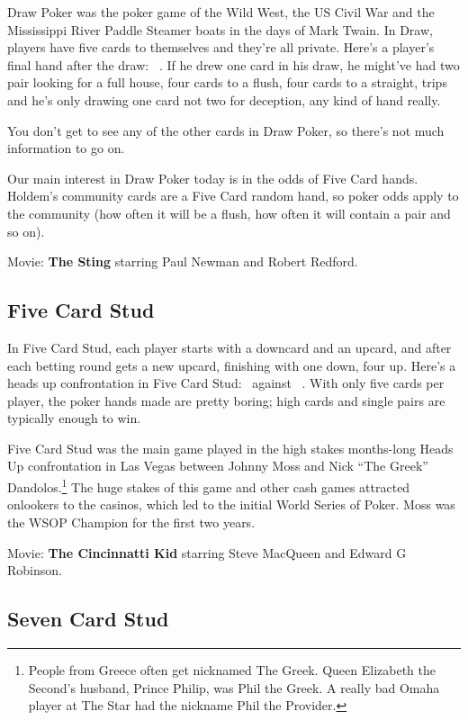Draw Poker was the poker game of the Wild West, the US Civil War and
the Mississippi River Paddle Steamer boats in the days of Mark Twain.
In Draw, players have five cards to themselves and they're
all private. Here's a player's final hand after the draw:
\back\back\back\back\back\ . If he drew one card in his draw,
he might've had two pair looking for a full house, four cards to a
flush, four cards to a straight, trips and he's only drawing one card
not two for deception, any kind of hand really.

You don't get to see any of the other cards in Draw Poker, so there's
not much information to go on.

Our main interest in Draw Poker today is in the odds of Five Card
hands. Holdem's community cards are a Five Card random hand, so poker
odds apply to the community (how often it will be a flush, how often
it will contain a pair and so on).

Movie: \textbf{The Sting} starring Paul Newman and Robert Redford.

\subsection{Five Card Stud}

In Five Card Stud, each player starts with a downcard and an upcard,
and after each betting round gets a new upcard, finishing with one
down, four up. Here's a heads up confrontation in Five Card Stud:
\back\nines\Qc\Jc\tred\ against \back\fourh\Jh\tend\trec\ . With
only five cards per player, the poker hands made are pretty boring;
high cards and single pairs are typically enough to win.

Five Card Stud was the main game played in the high stakes months-long
Heads Up confrontation in Las Vegas between Johnny Moss and Nick ``The
Greek'' Dandolos.\footnote{People from Greece often get nicknamed The
Greek. Queen Elizabeth the Second's husband, Prince Philip, was Phil
the Greek. A really bad Omaha player at The Star had the nickname Phil the
Provider.} The huge stakes of this game and other cash games
attracted onlookers to the casinos, which led to the initial World
Series of Poker. Moss was the WSOP Champion for the first two years.

Movie: \textbf{The Cincinnatti Kid} starring Steve MacQueen and Edward G
Robinson.

\subsection{Seven Card Stud}


